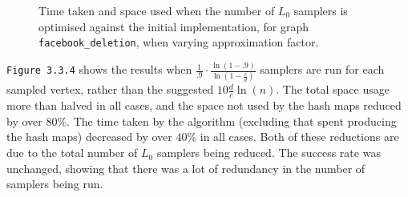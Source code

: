 \documentclass[11pt,twoside,a4paper]{report}
\begin{document}
\begin{figure}[H]
	\label{Figure 16}
	\caption{Time taken and space used when the number of $L_0$ samplers is optimised against the initial implementation, for graph \texttt{facebook\_deletion}, when varying approximation factor.}
\end{figure}
\texttt{Figure 3.3.4} shows the results when $\frac1{.9}\cdot\frac{\ln(1-.9)}{\ln(1-\frac{c}d)}$ samplers are run for each sampled vertex, rather than the suggested $10\frac{d}{c}\ln(n)$. The total space usage more than halved in all cases, and the space not used by the hash maps reduced by over $80\%$. The time taken by the algorithm (excluding that spent producing the hash maps) decreased by over $40\%$ in all cases. Both of these reductions are due to the total number of $L_0$ samplers being reduced. The success rate was unchanged, showing that there was a lot of redundancy in the number of samplers being run.
\end{document}
